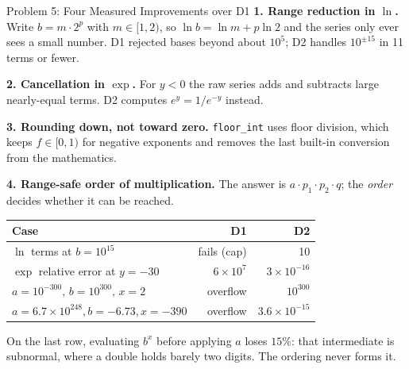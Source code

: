 \documentclass[11pt]{beamer}
\begin{document}
\begin{frame}{Problem 5: Four Measured Improvements over D1}
  \footnotesize
  \textbf{1. Range reduction in $\ln$.} Write $b = m \cdot 2^{p}$ with
  $m \in [1,2)$, so $\ln b = \ln m + p \ln 2$ and the series only ever sees a
  small number. D1 rejected bases beyond about $10^{5}$; D2 handles
  $10^{\pm 15}$ in 11 terms or fewer.
  \smallskip

  \textbf{2. Cancellation in $\exp$.} For $y < 0$ the raw series adds and
  subtracts large nearly-equal terms. D2 computes $e^{y} = 1/e^{-y}$ instead.
  \smallskip

  \textbf{3. Rounding down, not toward zero.} \texttt{floor\_int} uses floor
  division, which keeps $f \in [0,1)$ for negative exponents and removes the
  last built-in conversion from the mathematics.
  \smallskip

  \textbf{4. Range-safe order of multiplication.} The answer is
  $a \cdot p_1 \cdot p_2 \cdot q$; the \emph{order} decides whether it can be
  reached.
  \smallskip

  \centering
  \begin{tabular}{lrr}
    \toprule
    Case & D1 & D2 \\
    \midrule
    $\ln$ terms at $b = 10^{15}$              & fails (cap)          & 10 \\
    $\exp$ relative error at $y = -30$        & $6\times10^{7}$      & $3\times10^{-16}$ \\
    $a=10^{-300},\, b=10^{300},\, x=2$        & overflow             & $10^{300}$ \\
    $a=6.7\!\times\!10^{248},b=-6.73,x=-390$  & overflow             & $3.6\times10^{-15}$ \\
    \bottomrule
  \end{tabular}
  \smallskip

  \raggedright On the last row, evaluating $b^{x}$ before applying $a$ loses
  $15\%$: that intermediate is subnormal, where a double holds barely two
  digits. The ordering never forms it.
\end{frame}
\end{document}
